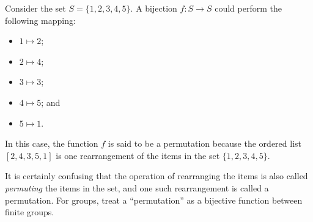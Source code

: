 \begin{example}
    Consider the set $S = \{1, 2, 3, 4, 5\}$. A bijection $f: S \to S$ could perform the following mapping:
    \begin{multicols}{3}
        \begin{itemize}
            \item $1 \mapsto 2$;
            \item $2 \mapsto 4$;
            \item $3 \mapsto 3$;
            \item $4 \mapsto 5$; and
            \item $5 \mapsto 1$.
        \end{itemize}
    \end{multicols}
    In this case, the function $f$ is said to be a permutation because the ordered list $[2, 4, 3, 5, 1]$ is one rearrangement of the items in the set $\{1, 2, 3, 4, 5\}$.
\end{example}

\begin{remark}
    It is certainly confusing that the operation of rearranging the items is also called \textit{permuting} the items in the set, and one such rearrangement is called a permutation. For groups, treat a ``permutation'' as a bijective function between finite groups.
\end{remark}


